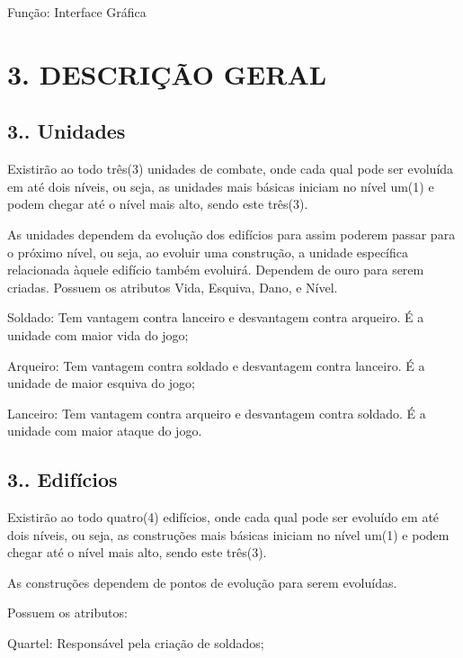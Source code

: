  \-Função\-: \-Interface \-Gráfica\par
\par
\par
 \hypertarget{index_descricao}{}\section{3. D\-E\-S\-C\-R\-IÇÃ\-O G\-E\-R\-A\-L}\label{index_descricao}
\hypertarget{index_unidades}{}\subsection{3.. Unidades}\label{index_unidades}
\-Existirão ao todo três(3) unidades de combate, onde cada qual pode ser evoluída em até dois níveis, ou seja, as unidades mais básicas iniciam no nível um(1) e podem chegar até o nível mais alto, sendo este três(3).\par
 \-As unidades dependem da evolução dos edifícios para assim poderem passar para o próximo nível, ou seja, ao evoluir uma construção, a unidade específica relacionada àquele edifício também evoluirá. \-Dependem de ouro para serem criadas. \-Possuem os atributos \-Vida, \-Esquiva, \-Dano, e \-Nível.\par
\par
 \-Soldado\-: \-Tem vantagem contra lanceiro e desvantagem contra arqueiro. É a unidade com maior vida do jogo;\par
 \-Arqueiro\-: \-Tem vantagem contra soldado e desvantagem contra lanceiro. É a unidade de maior esquiva do jogo;\par
 \-Lanceiro\-: \-Tem vantagem contra arqueiro e desvantagem contra soldado. É a unidade com maior ataque do jogo.\par
 \hypertarget{index_edificios}{}\subsection{3.. Edifícios}\label{index_edificios}
\-Existirão ao todo quatro(4) edifícios, onde cada qual pode ser evoluído em até dois níveis, ou seja, as construções mais básicas iniciam no nível um(1) e podem chegar até o nível mais alto, sendo este três(3).\par
 \-As construções dependem de pontos de evolução para serem evoluídas.\par
\par
 \-Possuem os atributos\-:\par
 \-Quartel\-: \-Responsável pela criação de soldados;\par

